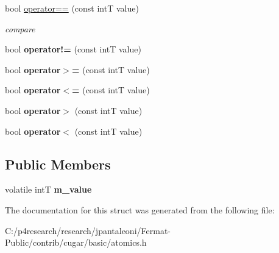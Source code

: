 \begin{DoxyCompactItemize}
bool \hyperlink{structcugar_1_1_atomic_int_ac29beff61e3ba39b7cdc29d5a641e1d1}{operator==} (const intT value)
\begin{DoxyCompactList}\small\item\em compare \end{DoxyCompactList}\item 
\mbox{\label{structcugar_1_1_atomic_int_a0708b84dccf325b98ea43559f66512c2}} 
bool {\bfseries operator!=} (const intT value)
\item 
\mbox{\label{structcugar_1_1_atomic_int_acef9dcb8a7bccdb5fae0b39a4975a2d3}} 
bool {\bfseries operator$>$=} (const intT value)
\item 
\mbox{\label{structcugar_1_1_atomic_int_a5536df778e10b9d1c19f70122978997c}} 
bool {\bfseries operator$<$=} (const intT value)
\item 
\mbox{\label{structcugar_1_1_atomic_int_a998c66873b12252a481991938d88ece0}} 
bool {\bfseries operator$>$} (const intT value)
\item 
\mbox{\label{structcugar_1_1_atomic_int_a56454282edf319aa07dcb3b7ea8b55a0}} 
bool {\bfseries operator$<$} (const intT value)
\end{DoxyCompactItemize}
\subsection*{Public Members}
\begin{DoxyCompactItemize}
\item 
\mbox{\label{structcugar_1_1_atomic_int_ad3678bfe37fbd26cf5ce3eb79c18181f}} 
volatile intT {\bfseries m\+\_\+value}
\end{DoxyCompactItemize}


The documentation for this struct was generated from the following file\+:\begin{DoxyCompactItemize}
\item 
C\+:/p4research/research/jpantaleoni/\+Fermat-\/\+Public/contrib/cugar/basic/atomics.\+h\end{DoxyCompactItemize}

